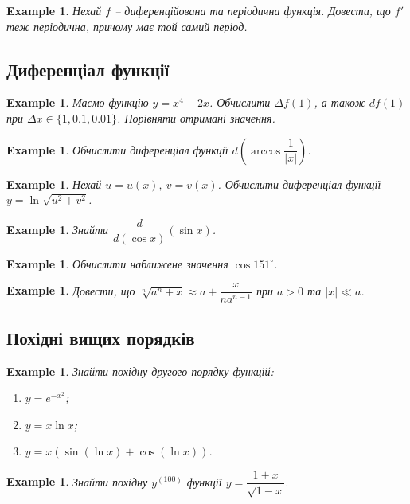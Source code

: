 \documentclass[a4paper, 14pt]{article}
\theoremstyle{theoremdd}
\theoremstyle{theoremdd}
\theoremstyle{theoremdd}
\theoremstyle{theoremdd}
\newtheorem{example}[theorem]{Example}
\theoremstyle{theoremdd}
\theoremstyle{theoremdd}
\theoremstyle{theoremdd}
\theoremstyle{theoremdd}
\theoremstyle{theoremdd}
\begin{document}
\begin{example}
Нехай $f$ -- диференційована та періодична функція. Довести, що $f'$ теж періодична, причому має той самий період.
\end{example}

\subsection{Диференціал функції}
\begin{example}
Маємо функцію $y = x^4 - 2x$. Обчислити $\Delta f(1)$, а також $df(1)$ при $\Delta x \in \{1,0.1,0.01\}$. Порівняти отримані значення.
\end{example}

\begin{example}
Обчислити диференціал функції $d\left( \arccos \dfrac{1}{|x|}\right)$.
\end{example}

\begin{example}
Нехай $u = u(x),\ v = v(x)$. Обчислити диференціал функції $y = \ln \sqrt{u^2+v^2}$.
\end{example}

\begin{example}
Знайти $\dfrac{d}{d(\cos x)} (\sin x)$.
\end{example}

\begin{example}
Обчислити наближене значення $\cos 151^\circ$.
\end{example}

\begin{example}
Довести, що $\sqrt[n]{a^n + x} \approx a + \dfrac{x}{na^{n-1}}$ при $a > 0$ та $|x| \ll a$.
\end{example}

\subsection{Похідні вищих порядків}
\begin{example}
Знайти похідну другого порядку функцій:
\begin{enumerate}[nosep,wide=0pt,label={\arabic*)}]
\item $y = e^{-x^2}$;
\item $y = x \ln x$;
\item $y = x (\sin (\ln x) + \cos (\ln x))$.
\end{enumerate}
\end{example}

\begin{example}
Знайти похідну $y^{(100)}$  функції $y = \dfrac{1+x}{\sqrt{1-x}}$.
\end{example}
\end{document}
